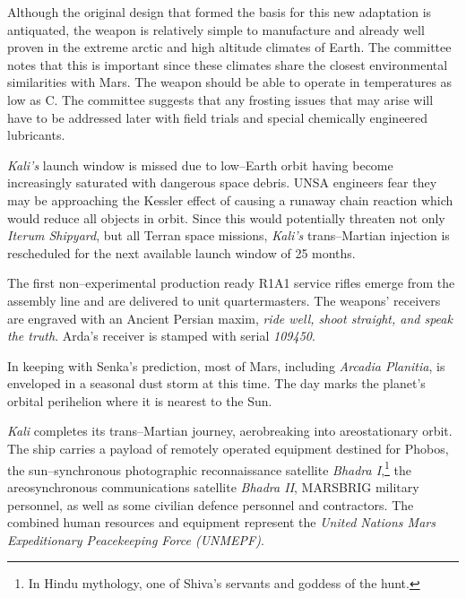 Although the original design that formed the basis for this new adaptation is antiquated, the weapon is relatively simple to manufacture and already well proven in the extreme arctic and high altitude climates of Earth. The committee notes that this is important since these climates share the closest environmental similarities with Mars. The weapon should be able to operate in temperatures as low as C. The committee suggests that any frosting issues that may arise will have to be addressed later with field trials and special chemically engineered lubricants.
\StopTimelineDate

{\it Kali's} launch window is missed due to low--Earth orbit having become increasingly saturated with dangerous space debris. UNSA engineers fear they may be approaching the Kessler effect of causing a runaway chain reaction which would reduce all objects in orbit. Since this would potentially threaten not only {\it Iterum Shipyard}, but all Terran space missions, {\it Kali's} trans--Martian injection is rescheduled for the next available launch window of 25 months.
\StopTimelineDate

The first non--experimental production ready R1A1 service rifles emerge from the assembly line and are delivered to unit quartermasters. The weapons' receivers are engraved with an Ancient Persian maxim, {\it ride well, shoot straight, and speak the truth}. Arda's receiver is stamped with serial {\it 109450}.
\StopTimelineDate

In keeping with Senka's prediction, most of Mars, including {\it Arcadia Planitia}, is enveloped in a seasonal dust storm at this time. The day marks the planet's orbital perihelion where it is nearest to the Sun.
\StopTimelineDate

{\it Kali} completes its trans--Martian journey, aerobreaking into areostationary orbit. The ship carries a payload of remotely operated equipment destined for Phobos, the sun--synchronous photographic reconnaissance satellite {\it Bhadra I},\footnote{In Hindu mythology, one of Shiva's servants and goddess of the hunt.} the areosynchronous communications satellite {\it Bhadra II}, MARSBRIG military personnel, as well as some civilian defence personnel and contractors. The combined human resources and equipment represent the {\it United Nations Mars Expeditionary Peacekeeping Force (UNMEPF)}.
\StopTimelineDate

